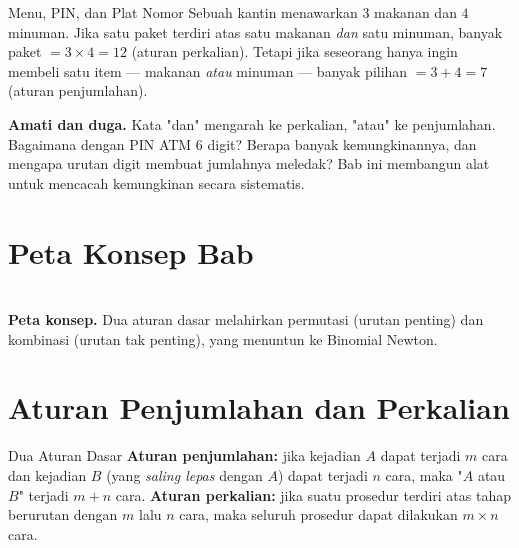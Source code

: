 \documentclass[11pt,a4paper]{report}
\theoremstyle{gaya}
\begin{document}
\begin{studikasus}{Menu, PIN, dan Plat Nomor}
Sebuah kantin menawarkan $3$ makanan dan $4$ minuman. Jika satu paket terdiri atas satu makanan \emph{dan} satu minuman, banyak paket $=3\times4=12$ (aturan perkalian). Tetapi jika seseorang hanya ingin membeli satu item --- makanan \emph{atau} minuman --- banyak pilihan $=3+4=7$ (aturan penjumlahan).
\smallskip

\textbf{Amati dan duga.} Kata "dan" mengarah ke perkalian, "atau" ke penjumlahan. Bagaimana dengan PIN ATM $6$ digit? Berapa banyak kemungkinannya, dan mengapa urutan digit membuat jumlahnya meledak? Bab ini membangun alat untuk mencacah kemungkinan secara sistematis.
\end{studikasus}

\section*{Peta Konsep Bab}
\begin{center}
\\
\small \textbf{Peta konsep.} Dua aturan dasar melahirkan permutasi (urutan penting) dan kombinasi (urutan tak penting), yang menuntun ke Binomial Newton.
\end{center}

\section{Aturan Penjumlahan dan Perkalian}
\begin{konsep}{Dua Aturan Dasar}
\textbf{Aturan penjumlahan:} jika kejadian $A$ dapat terjadi $m$ cara dan kejadian $B$ (yang \emph{saling lepas} dengan $A$) dapat terjadi $n$ cara, maka "$A$ atau $B$" terjadi $m+n$ cara. \textbf{Aturan perkalian:} jika suatu prosedur terdiri atas tahap berurutan dengan $m$ lalu $n$ cara, maka seluruh prosedur dapat dilakukan $m\times n$ cara.
\end{konsep}
\end{document}
